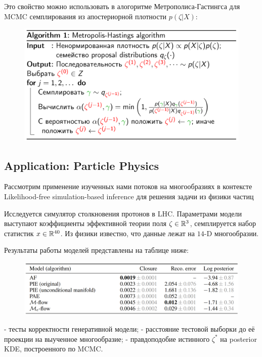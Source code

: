 \newpage

Это свойство можно использовать в алогоритме Метрополиса-Гастингса для MCMC семплирования из апостериорной плотности $p(\zeta|X)$: 
\begin{figure}[h]
    \centering
    \includegraphics[width=0.8\linewidth]{chapters/petr_mokrov_s1/figs/metr_hast.png}
\end{figure}

\subsection{Application: Particle Physics}

Рассмотрим применение изученных нами потоков на многообразиях в контексте Likelihood-free simulation-based inference для решения задачи из физики частиц

Исследуется симулятор столкновения протонов в LHC. Параметрами модели выступают коэффициенты эффективной теории поля $\zeta \in \mathbb{R}^3$, семплируется набор статистик $x \in \mathbb{R}^{40}$. Из физики известно, что данные лежат на $14$-D многообразии.

Результаты работы моделей представлены на таблице ниже: 

\begin{figure}[h]
    \centering
    \includegraphics[width=0.9\linewidth]{chapters/petr_mokrov_s1/figs/particle_physics_res.png}
\end{figure}

 - тесты корректности генеративной модели;  - расстояние тестовой выборки до её проекции на выученное многообразие;  - правдоподобие истинного $\zeta^*$ на posterior KDE, построенного по MCMC.




